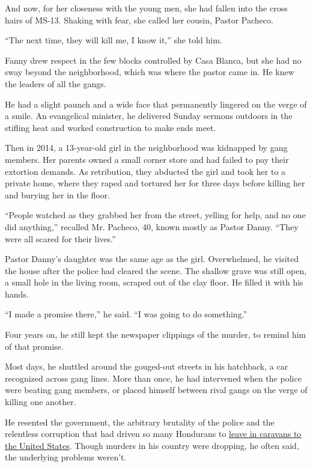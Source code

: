 And now, for her closeness with the young men, she had fallen into the
cross hairs of MS-13. Shaking with fear, she called her cousin, Pastor
Pacheco.

``The next time, they will kill me, I know it,'' she told him.

Fanny drew respect in the few blocks controlled by Casa Blanca, but she
had no sway beyond the neighborhood, which was where the pastor came in.
He knew the leaders of all the gangs.

He had a slight paunch and a wide face that permanently lingered on the
verge of a smile. An evangelical minister, he delivered Sunday sermons
outdoors in the stifling heat and worked construction to make ends meet.

Then in 2014, a 13-year-old girl in the neighborhood was kidnapped by
gang members. Her parents owned a small corner store and had failed to
pay their extortion demands. As retribution, they abducted the girl and
took her to a private home, where they raped and tortured her for three
days before killing her and burying her in the floor.

``People watched as they grabbed her from the street, yelling for help,
and no one did anything,'' recalled Mr. Pacheco, 40, known mostly as
Pastor Danny. ``They were all scared for their lives.''

Pastor Danny's daughter was the same age as the girl. Overwhelmed, he
visited the house after the police had cleared the scene. The shallow
grave was still open, a small hole in the living room, scraped out of
the clay floor. He filled it with his hands.

``I made a promise there,'' he said. ``I was going to do something.''

Four years on, he still kept the newspaper clippings of the murder, to
remind him of that promise.

Most days, he shuttled around the gouged-out streets in his hatchback, a
car recognized across gang lines. More than once, he had intervened when
the police were beating gang members, or placed himself between rival
gangs on the verge of killing one another.

He resented the government, the arbitrary brutality of the police and
the relentless corruption that had driven so many Hondurans to
\href{https://www.nytimes3xbfgragh.onion/2018/10/24/world/americas/migrant-caravan-trump.html}{leave
in caravans to the United States}. Though murders in his country were
dropping, he often said, the underlying problems weren't.

